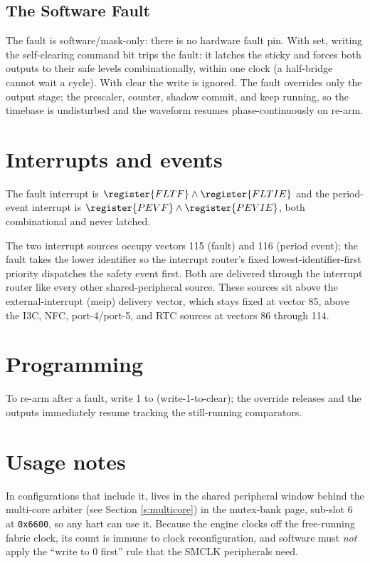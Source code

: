 \subsection{The Software Fault}

The fault is software/mask-only: there is no hardware fault pin. With  set, writing the self-clearing  command bit trips the fault: it latches the sticky  and forces both outputs to their safe levels combinationally, within one clock (a half-bridge cannot wait a cycle). With  clear the  write is ignored. The fault overrides only the output stage; the prescaler, counter, shadow commit, and  keep running, so the timebase is undisturbed and the waveform resumes phase-continuously on re-arm.

\section{Interrupts and events}

The fault interrupt is $\register{FLTF} \wedge \register{FLTIE}$ and the period-event interrupt is $\register{PEVF} \wedge \register{PEVIE}$, both combinational and never latched.

The two interrupt sources occupy vectors 115 (fault) and 116 (period event); the fault takes the lower identifier so the interrupt router's fixed lowest-identifier-first priority dispatches the safety event first. Both are delivered through the interrupt router like every other shared-peripheral source. These sources sit above the external-interrupt (meip) delivery vector, which stays fixed at vector 85, above the I3C, NFC,  port-4/port-5, and RTC sources at vectors 86 through 114.

\section{Programming}

To re-arm after a fault, write 1 to  (write-1-to-clear); the override releases and the outputs immediately resume tracking the still-running comparators.

\section{Usage notes}

In configurations that include it,  lives in the shared peripheral window behind the multi-core arbiter (see Section \ref{s:multicore}) in the mutex-bank page, sub-slot 6 at \texttt{0x6600}, so any hart can use it. Because the engine clocks off the free-running fabric clock, its count is immune to clock reconfiguration, and software must \emph{not} apply the ``write  to 0 first'' rule that the SMCLK peripherals need.

